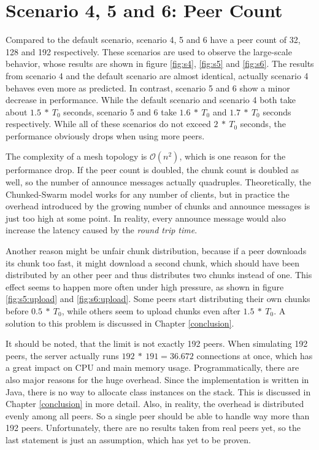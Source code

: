 \pagebreak
\section{Scenario 4, 5 and 6: Peer Count}
\label{evaluation:456}

Compared to the default scenario, scenario 4, 5 and 6 have a peer count of 32, 128 and 192 respectively. These scenarios are used to observe the large-scale behavior, whose results are shown in figure \ref{fig:s4}, \ref{fig:s5} and \ref{fig:s6}. The results from scenario 4 and the default scenario are almost identical, actually scenario 4 behaves even more as predicted. In contrast, scenario 5 and 6 show a minor decrease in performance. While the default scenario and scenario 4 both take about $1.5\:*\:T_0$ seconds, scenario 5 and 6 take $1.6\:*\:T_0$ and $1.7\:*\:T_0$ seconds respectively. While all of these scenarios do not exceed $2\:*\:T_0$ seconds, the performance obviously drops when using more peers.

The complexity of a mesh topology is ${\mathcal O(n^2)}$, which is one reason for the performance drop. If the peer count is doubled, the chunk count is doubled as well, so the number of announce messages actually quadruples. Theoretically, the Chunked-Swarm model works for any number of clients, but in practice the overhead introduced by the growing number of chunks and announce messages is just too high at some point. In reality, every announce message would also increase the latency caused by the \emph{round trip time}. 

Another reason might be unfair chunk distribution, because if a peer downloads its chunk too fast, it might download a second chunk, which should have been distributed by an other peer and thus distributes two chunks instead of one. This effect seems to happen more often under high pressure, as shown in figure \ref{fig:s5:upload} and \ref{fig:s6:upload}. Some peers start distributing their own chunks before $0.5\:*\:T_0$, while others seem to upload chunks even after $1.5\:*\:T_0$. A solution to this problem is discussed in Chapter \ref{conclusion}.

It should be noted, that the limit is not exactly 192 peers. When simulating 192 peers, the server actually runs $192\:*\:191=36.672$ connections at once, which has a great impact on CPU and main memory usage. Programmatically, there are also major reasons for the huge overhead. Since the implementation is written in Java, there is no way to allocate class instances on the stack. This is discussed in Chapter \ref{conclusion} in more detail. Also, in reality, the overhead is distributed evenly among all peers. So a single peer should be able to handle way more than 192 peers. Unfortunately, there are no results taken from real peers yet, so the last statement is just an assumption, which has yet to be proven.

